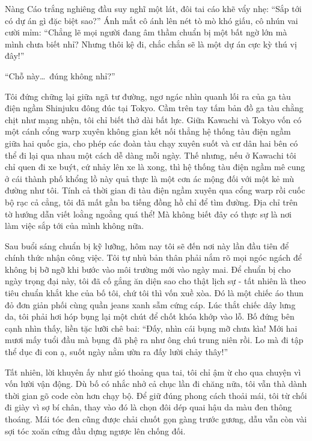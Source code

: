 \documentclass[../main.tex]{subfiles}
\begin{document}
Nàng Cáo trắng nghiêng đầu suy nghĩ một lát, đôi tai cáo khẽ vẩy nhẹ: ``Sắp tới có dự án gì đặc biệt sao?'' Ánh mắt cô ánh lên nét tò mò khó giấu, cô nhún vai cười mỉm: ``Chẳng lẽ mọi người đang âm thầm chuẩn bị một bất ngờ lớn mà mình chưa biết nhỉ? Nhưng thôi kệ đi, chắc chắn sẽ là một dự án cực kỳ thú vị đây!''


\omk


``Chỗ này\dots\ đúng không nhỉ?''

Tôi đứng chững lại giữa ngã tư đường, ngơ ngác nhìn quanh lối ra của ga tàu điện ngầm Shinjuku đông đúc tại Tokyo. Cầm trên tay tấm bản đồ ga tàu chằng chịt như mạng nhện, tôi chỉ biết thở dài bất lực. Giữa Kawachi và Tokyo vốn có một cánh cổng warp xuyên không gian kết nối thẳng hệ thống tàu điện ngầm giữa hai quốc gia, cho phép các đoàn tàu chạy xuyên suốt và cư dân hai bên có thể đi lại qua nhau một cách dễ dàng mỗi ngày. Thế nhưng, nếu ở Kawachi tôi chỉ quen đi xe buýt, cứ nhảy lên xe là xong, thì hệ thống tàu điện ngầm mê cung ở cái thành phố khổng lồ này quả thực là một cơn ác mộng đối với một kẻ mù đường như tôi. Tính cả thời gian đi tàu điện ngầm xuyên qua cổng warp rồi cuốc bộ rạc cả cẳng, tôi đã mất gần ba tiếng đồng hồ chỉ để tìm đường. Địa chỉ trên tờ hướng dẫn viết loằng ngoằng quá thể! Mà không biết đây có thực sự là nơi làm việc sắp tới của mình không nữa.

Sau buổi sáng chuẩn bị kỹ lưỡng, hôm nay tôi sẽ đến nơi này lần đầu tiên để chính thức nhận công việc. Tôi tự nhủ bản thân phải nắm rõ mọi ngóc ngách để không bị bỡ ngỡ khi bước vào môi trường mới vào ngày mai. Để chuẩn bị cho ngày trọng đại này, tôi đã cố gắng ăn diện sao cho thật lịch sự - tất nhiên là theo tiêu chuẩn khắt khe của bố tôi, chứ tôi thì vốn xuề xòa. Đó là một chiếc áo thun đỏ đơn giản phối cùng quần jeans xanh sẫm cứng cáp. Lúc thắt chiếc dây lưng da, tôi phải hơi hóp bụng lại một chút để chốt khóa khớp vào lỗ. Bố đứng bên cạnh nhìn thấy, liền tặc lưỡi chê bai: ``Đấy, nhìn cái bụng mỡ chưa kìa! Mới hai mươi mấy tuổi đầu mà bụng đã phệ ra như ông chú trung niên rồi. Lo mà đi tập thể dục đi con ạ, suốt ngày nằm ườn ra đấy lười chảy thây!''

Tất nhiên, lời khuyên ấy như gió thoảng qua tai, tôi chỉ ậm ừ cho qua chuyện vì vốn lười vận động. Dù bố có nhắc nhở cả chục lần đi chăng nữa, tôi vẫn thà dành thời gian gõ code còn hơn chạy bộ. Để giữ đúng phong cách thoải mái, tôi từ chối đi giày vì sợ bí chân, thay vào đó là chọn đôi dép quai hậu da màu đen thông thoáng. Mái tóc đen cũng được chải chuốt gọn gàng trước gương, dẫu vẫn còn vài sợi tóc xoăn cứng đầu dựng ngược lên chống đối.
\end{document}
